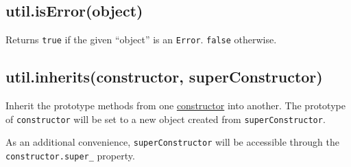 \begin{Shaded}
\begin{Highlighting}[]
 \NormalTok{);}

\NormalTok{(} \NormalTok{())}
\NormalTok{(}\NormalTok{())}
\NormalTok{(\{\})}
\end{Highlighting}
\end{Shaded}

\subsection{util.isError(object)}

Returns \texttt{true} if the given ``object'' is an \texttt{Error}.
\texttt{false} otherwise.

\begin{Shaded}
\begin{Highlighting}[]
 \NormalTok{);}

\NormalTok{(} 
\NormalTok{(} 
\NormalTok{(\{ }\NormalTok{: }\NormalTok{, }\NormalTok{: } \NormalTok{\})}
\end{Highlighting}
\end{Shaded}

\subsection{util.inherits(constructor, superConstructor)}

Inherit the prototype methods from one
\href{https://developer.mozilla.org/en/JavaScript/Reference/Global\_Objects/Object/constructor}{constructor}
into another. The prototype of \texttt{constructor} will be set to a new
object created from \texttt{superConstructor}.

As an additional convenience, \texttt{superConstructor} will be
accessible through the \texttt{constructor.super\_} property.

